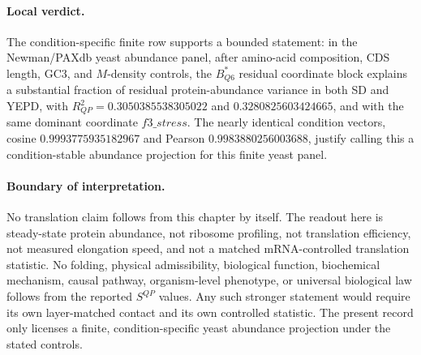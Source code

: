 \paragraph{Local verdict.}
The condition-specific finite row supports a bounded statement: in the Newman/PAXdb yeast abundance panel, after amino-acid composition, CDS length, GC3, and $M$-density controls, the $B^{\ast}_{Q6}$ residual coordinate block explains a substantial fraction of residual protein-abundance variance in both SD and YEPD, with $R^2_{QP}=0.3050385538305022$ and $0.3280825603424665$, and with the same dominant coordinate $f3\_stress$.  The nearly identical condition vectors, cosine $0.9993775935182967$ and Pearson $0.9983880256003688$, justify calling this a condition-stable abundance projection for this finite yeast panel.

\paragraph{Boundary of interpretation.}
No translation claim follows from this chapter by itself.  The readout here is steady-state protein abundance, not ribosome profiling, not translation efficiency, not measured elongation speed, and not a matched mRNA-controlled translation statistic.  No folding, physical admissibility, biological function, biochemical mechanism, causal pathway, organism-level phenotype, or universal biological law follows from the reported $S^{QP}$ values.  Any such stronger statement would require its own layer-matched contact and its own controlled statistic.  The present record only licenses a finite, condition-specific yeast abundance projection under the stated controls.